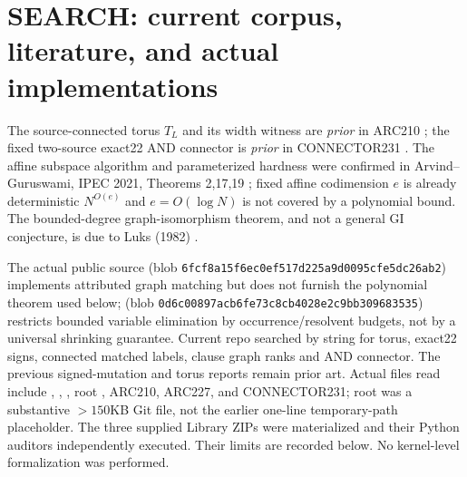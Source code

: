 \documentclass[10pt]{article}
\begin{document}
\section{SEARCH: current corpus, literature, and actual implementations}
The source-connected torus $T_L$ and its width witness are \emph{prior} in ARC210 \cite{arc210}; the fixed two-source exact22 AND connector is \emph{prior} in CONNECTOR231 \cite{connector}. The affine subspace algorithm and parameterized hardness were confirmed in Arvind--Guruswami, IPEC 2021, Theorems 2,17,19 \cite{arvind}; fixed affine codimension $e$ is already deterministic $N^{O(e)}$ and $e=O(\log N)$ is not covered by a polynomial bound. The bounded-degree graph-isomorphism theorem, and not a general GI conjecture, is due to Luks (1982) \cite{luks}.

The actual public source  (blob \texttt{6fcf8a15f6ec0ef517d225a9d0095cfe5dc26ab2}) implements attributed graph matching but does not furnish the polynomial theorem used below;  (blob \texttt{0d6c00897acb6fe73c8cb4028e2c9bb309683535}) restricts bounded variable elimination by occurrence/resolvent budgets, not by a universal shrinking guarantee. Current repo searched by string for torus, exact22 signs, connected matched labels, clause graph ranks and AND connector. The previous signed-mutation and torus reports remain prior art. Actual files read include , , , root , ARC210, ARC227, and CONNECTOR231; root was a substantive $>150$KB Git file, not the earlier one-line temporary-path placeholder. The three supplied Library ZIPs were materialized and their Python auditors independently executed. Their limits are recorded below. No kernel-level formalization was performed.
\end{document}
